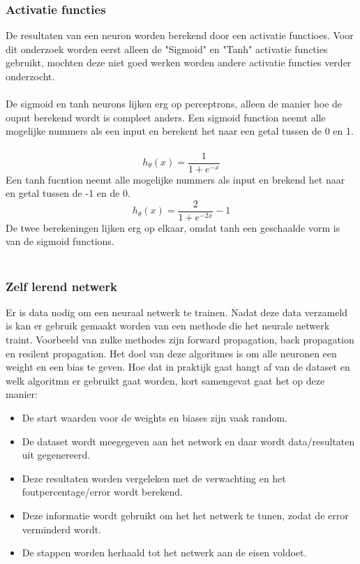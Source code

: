 \subsubsection{Activatie functies}
De resultaten van een neuron worden berekend door een activatie functioes. Voor dit onderzoek worden eerst alleen de "Sigmoid" en "Tanh" activatie functies gebruikt, mochten deze niet goed werken worden andere activatie functies verder onderzocht\cite{learning}. \\\\
De sigmoid en tanh neurons lijken erg op perceptrons, alleen de manier hoe de ouput berekend wordt is compleet anders. Een sigmoid function neemt alle mogelijke nummers als een input en berekent het naar een getal tussen de 0 en 1.\\\\
\begin{equation}
    h_ \theta (x) =  \frac{\mathrm{1} }{\mathrm{1} + e^{-x} }  \label{sigmoid}
  \end{equation}
Een tanh fucntion neemt alle mogelijke nummers als input en brekend het naar en getal tussen de -1 en de 0.\\
\begin{equation}
    h_ \theta (x) =  \frac{\mathrm{2} }{\mathrm{1} + e^{-2x} } -1 \label{tanh}
  \end{equation}
De twee berekeningen lijken erg op elkaar, omdat tanh een geschaalde vorm is van de sigmoid functions.\\\\ %

\subsubsection{Zelf lerend netwerk}
Er is data nodig om een neuraal netwerk te trainen. Nadat deze data verzameld is kan er gebruik gemaakt worden van een methode die het neurale netwerk traint. Voorbeeld van zulke methodes zijn forward propagation, back propagation en resilent propagation. Het doel van deze algoritmes is om alle neuronen een weight en een bias te geven. Hoe dat in praktijk gaat hangt af van de dataset en welk algoritmn er gebruikt gaat worden, kort samengevat gaat het op deze manier:
\begin{itemize}
\item De start waarden voor de weights en biases zijn vaak random.
\item De dataset wordt meegegeven aan het network en daar wordt data/resultaten uit gegenereerd.
\item Deze resultaten worden vergeleken met de verwachting en het foutpercentage/error wordt berekend.
\item Deze informatie wordt gebruikt om het het netwerk te tunen, zodat de error verminderd wordt.
\item De stappen worden herhaald tot het netwerk aan de eisen voldoet.
\end{itemize}\cite{learning}

